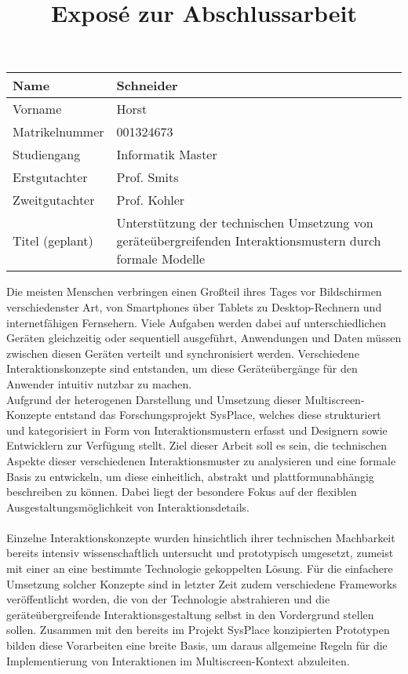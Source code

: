 \documentclass[11pt,a4paper]{article}
\author{}
\title{Exposé zur Abschlussarbeit}
\date{}
\begin{document}
\maketitle\vspace{-1cm}

\begin{center}
\bgroup
\def\arraystretch{1.5}
\begin{tabular}{|l|p{8cm}|}
\hline 
Name & Schneider \\ 
\hline 
Vorname & Horst \\ 
\hline 
Matrikelnummer & 001324673 \\ 
\hline 
Studiengang & Informatik Master \\ 
\hline 
Erstgutachter & Prof. Smits \\ 
\hline 
Zweitgutachter & Prof. Kohler \\ 
\hline 
Titel (geplant) & Unterstützung der technischen Umsetzung von geräteübergreifenden Interaktionsmustern durch formale Modelle \\ 
\hline 
\end{tabular} 
\egroup
\end{center}

\hfill 
\break
{}
Die meisten Menschen verbringen einen Großteil ihres Tages vor Bildschirmen verschiedenster Art, von Smartphones über Tablets zu Desktop-Rechnern und internetfähigen Fernsehern. Viele Aufgaben werden dabei auf unterschiedlichen Geräten gleichzeitig oder sequentiell ausgeführt, Anwendungen und Daten müssen zwischen diesen Geräten verteilt und synchronisiert werden. Verschiedene Interaktionskonzepte sind entstanden, um diese Geräteübergänge für den Anwender intuitiv nutzbar zu machen.\\
Aufgrund der heterogenen Darstellung und Umsetzung dieser Multiscreen-Konzepte entstand das Forschungsprojekt SysPlace, welches diese strukturiert und kategorisiert in Form von Interaktionsmustern erfasst und Designern sowie Entwicklern zur Verfügung stellt. 
Ziel dieser Arbeit soll es sein, die technischen Aspekte dieser verschiedenen Interaktionsmuster zu analysieren und eine formale Basis zu entwickeln, um diese einheitlich, abstrakt und plattformunabhängig beschreiben zu können. Dabei liegt der besondere Fokus auf der flexiblen Ausgestaltungsmöglichkeit von Interaktionsdetails.

\paragraph{}
Einzelne Interaktionskonzepte wurden hinsichtlich ihrer technischen Machbarkeit bereits intensiv wissenschaftlich untersucht und prototypisch umgesetzt, zumeist mit einer an eine bestimmte Technologie gekoppelten Lösung. Für die einfachere Umsetzung solcher Konzepte sind in letzter Zeit zudem verschiedene Frameworks veröffentlicht worden, die von der Technologie abstrahieren und die geräteübergreifende Interaktionsgestaltung selbst in den Vordergrund stellen sollen. Zusammen mit den bereits im Projekt SysPlace konzipierten Prototypen bilden diese Vorarbeiten eine breite Basis, um daraus allgemeine Regeln für die Implementierung von Interaktionen im Multiscreen-Kontext abzuleiten.
\end{document}
